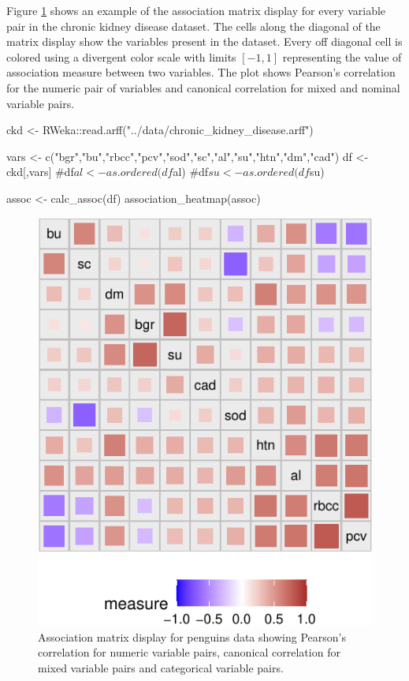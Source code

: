 Figure \ref{fig:assoc-heatmap} shows an example of the association
matrix display for every variable pair in the chronic kidney disease
dataset. The cells along the diagonal of the matrix display show the
variables present in the dataset. Every off diagonal cell is colored
using a divergent color scale with limits \([-1,1]\) representing the
value of association measure between two variables. The plot shows
Pearson's correlation for the numeric pair of variables and canonical
correlation for mixed and nominal variable pairs.

\begin{Schunk}
\begin{Sinput}
ckd <- RWeka::read.arff("../data/chronic_kidney_disease.arff")

vars <- c("bgr","bu","rbcc","pcv","sod","sc","al","su","htn","dm","cad")
df <- ckd[,vars]
#df$al <- as.ordered(df$al)
#df$su <- as.ordered(df$su)

assoc <- calc_assoc(df)
association_heatmap(assoc)
\end{Sinput}
\begin{figure}

{\centering \includegraphics{rj_paper_files/figure-latex/assoc-heatmap-1} 

}

\caption[Association matrix display for penguins data showing Pearson's correlation for numeric variable pairs, canonical correlation for mixed variable pairs and categorical variable pairs]{Association matrix display for penguins data showing Pearson's correlation for numeric variable pairs, canonical correlation for mixed variable pairs and categorical variable pairs.}\label{fig:assoc-heatmap}
\end{figure}
\end{Schunk}

